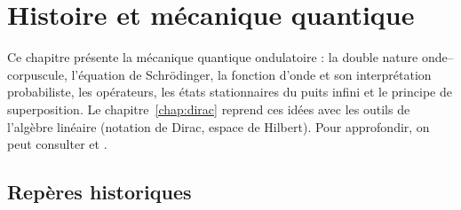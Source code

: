 
\providecommand{\ket}[1]{|#1\rangle}
\providecommand{\bra}[1]{\langle #1|}
\providecommand{\braket}[2]{\langle #1|#2\rangle}

\section{Histoire et mécanique quantique}\label{chap:histoire}

Ce chapitre présente la mécanique quantique ondulatoire : la double nature
onde--corpuscule, l'équation de Schrödinger, la fonction d'onde et son interprétation
probabiliste, les opérateurs, les états stationnaires du puits infini et le principe de
superposition. Le chapitre~\ref{chap:dirac} reprend ces idées avec les outils de l'algèbre
linéaire (notation de Dirac, espace de Hilbert). Pour approfondir, on peut consulter
\textcite{griffiths2018} et \textcite{cohen1973}.

\subsection{Repères historiques}\label{sec:histoire}

